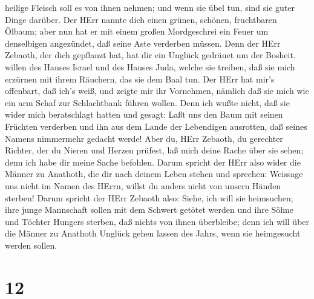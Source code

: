 heilige Fleisch soll es von ihnen nehmen; und wenn sie übel tun, sind
sie guter Dinge darüber.  Der HErr nannte dich einen
grünen, schönen, fruchtbaren Ölbaum; aber nun hat er mit einem großen
Mordgeschrei ein Feuer um denselbigen angezündet, daß seine Aste
verderben müssen.  Denn der HErr Zebaoth, der dich
gepflanzt hat, hat dir ein Unglück gedräuet um der Bosheit. willen des
Hauses Israel und des Hauses Juda, welche sie treiben, daß sie mich
erzürnen mit ihrem Räuchern, das sie dem Baal tun.  Der
HErr hat mir's offenbart, daß ich's weiß, und zeigte mir ihr Vornehmen,
 nämlich daß sie mich wie ein arm Schaf zur Schlachtbank
führen wollen. Denn ich wußte nicht, daß sie wider mich beratschlagt
hatten und gesagt: Laßt uns den Baum mit seinen Früchten verderben und
ihn aus dem Lande der Lebendigen ausrotten, daß seines Namens nimmermehr
gedacht werde!  Aber du, HErr Zebaoth, du gerechter
Richter, der du Nieren und Herzen prüfest, laß mich deine Rache über sie
sehen; denn ich habe dir meine Sache befohlen.  Darum
spricht der HErr also wider die Männer zu Anathoth, die dir nach deinem
Leben stehen und sprechen: Weissage uns nicht im Namen des HErrn, willst
du anders nicht von unsern Händen sterben!  Darum spricht
der HErr Zebaoth also: Siehe, ich will sie heimsuchen; ihre junge
Mannschaft sollen mit dem Schwert getötet werden und ihre Söhne und
Töchter Hungers sterben, daß nichts von ihnen überbleibe; 
denn ich will über die Männer zu Anathoth Unglück gehen lassen des
Jahrs, wenn sie heimgesucht werden sollen.

\hypertarget{section-11}{%
\section{12}\label{section-11}}


